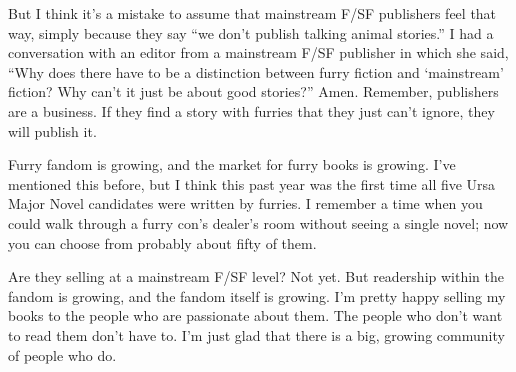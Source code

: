 But I think it's a mistake to assume that mainstream F/SF publishers feel that way, simply because they say ``we don't publish talking animal stories.'' I had a conversation with an editor from a mainstream F/SF publisher in which she said, ``Why does there have to be a distinction between furry fiction and `mainstream' fiction? Why can't it just be about good stories?'' Amen. Remember, publishers are a business. If they find a story with furries that they just can't ignore, they will publish it.

Furry fandom is growing, and the market for furry books is growing. I've mentioned this before, but I think this past year was the first time all five Ursa Major Novel candidates were written by furries. I remember a time when you could walk through a furry con's dealer's room without seeing a single novel; now you can choose from probably about fifty of them.

Are they selling at a mainstream F/SF level? Not yet. But readership within the fandom is growing, and the fandom itself is growing. I'm pretty happy selling my books to the people who are passionate about them. The people who don't want to read them don't have to. I'm just glad that there is a big, growing community of people who do.
